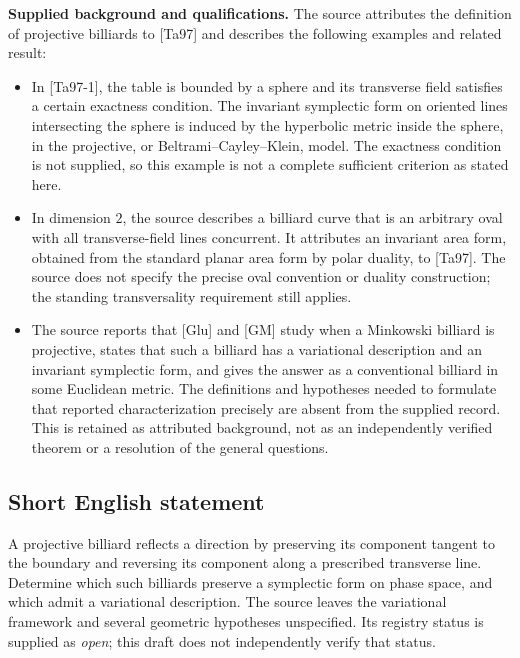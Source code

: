 \documentclass[11pt]{article}
\begin{document}
\textbf{Supplied background and qualifications.} The source attributes the definition of projective billiards to [Ta97] and describes the following examples and related result:
\begin{itemize}
\item In [Ta97-1], the table is bounded by a sphere and its transverse field satisfies a certain exactness condition. The invariant symplectic form on oriented lines intersecting the sphere is induced by the hyperbolic metric inside the sphere, in the projective, or Beltrami--Cayley--Klein, model. The exactness condition is not supplied, so this example is not a complete sufficient criterion as stated here.
\item In dimension \(2\), the source describes a billiard curve that is an arbitrary oval with all transverse-field lines concurrent. It attributes an invariant area form, obtained from the standard planar area form by polar duality, to [Ta97]. The source does not specify the precise oval convention or duality construction; the standing transversality requirement still applies.
\item The source reports that [Glu] and [GM] study when a Minkowski billiard is projective, states that such a billiard has a variational description and an invariant symplectic form, and gives the answer as a conventional billiard in some Euclidean metric. The definitions and hypotheses needed to formulate that reported characterization precisely are absent from the supplied record. This is retained as attributed background, not as an independently verified theorem or a resolution of the general questions.
\end{itemize}
\subsection{Short English statement}
A projective billiard reflects a direction by preserving its component tangent to the boundary and reversing its component along a prescribed transverse line. Determine which such billiards preserve a symplectic form on phase space, and which admit a variational description. The source leaves the variational framework and several geometric hypotheses unspecified. Its registry status is supplied as \emph{open}; this draft does not independently verify that status.
\end{document}
